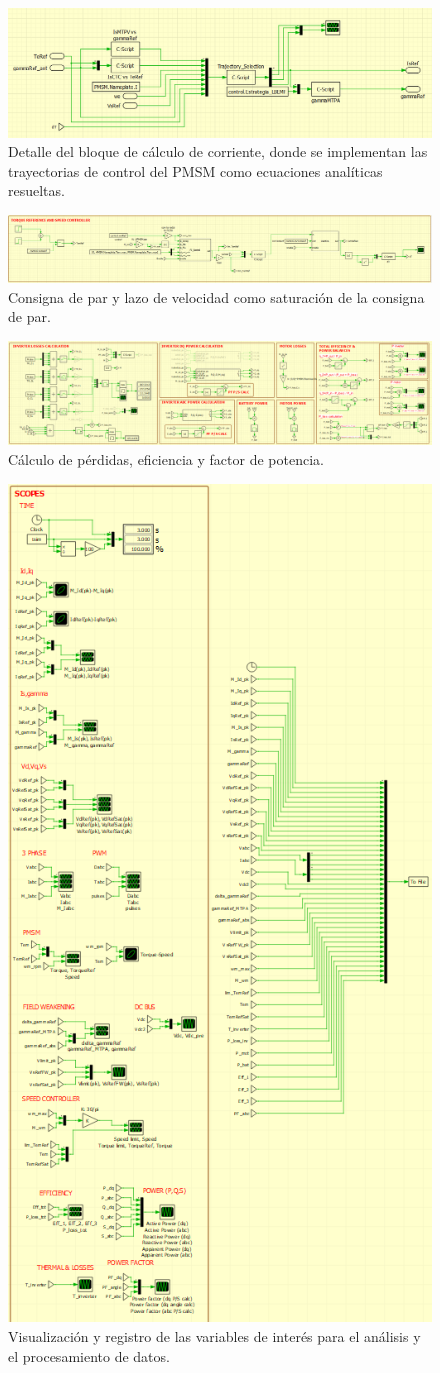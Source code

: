 \begin{figure}[H]
	\centering
	\includegraphics[width=0.7\linewidth]{fig/PLECS_currentref1}
	\caption{Detalle del bloque de cálculo de corriente, donde se implementan las trayectorias de control del PMSM como ecuaciones analíticas resueltas.}
\end{figure}
\begin{figure}[H]
	\centering
	\includegraphics[width=0.9\linewidth]{fig/PLECS_tqspeed}
	\caption{Consigna de par y lazo de velocidad como saturación de la consigna de par.}
\end{figure}
\begin{figure}[H]
	\centering
	\includegraphics[width=0.7\linewidth]{fig/PLECS_losses}
	\caption{Cálculo de pérdidas, eficiencia y factor de potencia.}
\end{figure}
\begin{figure}[H]
	\centering
	\includegraphics[width=0.4\linewidth]{fig/PLECS_scopes}
	\caption{Visualización y registro de las variables de interés para el análisis y el procesamiento de datos.}
\end{figure}


